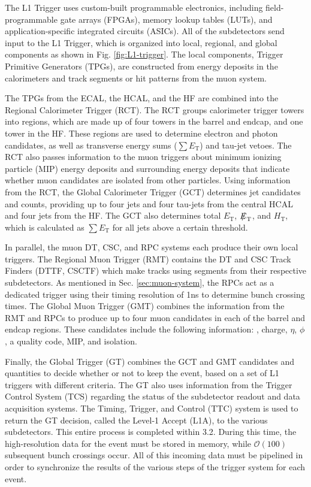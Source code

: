 \documentclass[12pt]{thesis}  %
\def\ET{\ensuremath{{E}_{\mathrm{T}}}}
\def\HT{\ensuremath{{H}_{\mathrm{T}}}}
\def\eslash{\ensuremath{{\hbox{$E$\kern-0.6em\lower-.05ex\hbox{/}\kern0.10em}}}}
\def\met{\mbox{$\eslash_\text{T}$}\xspace} %
\def\sumet{\mbox{$\sum E_\text{T}$}\xspace}
\begin{document}
The L1 Trigger uses custom-built programmable electronics, including field-programmable gate arrays (FPGAs), memory lookup tables (LUTs), and application-specific integrated circuits (ASICs). All of the subdetectors send input to the L1 Trigger, which is organized into local, regional, and global components as shown in Fig. \ref{fig:L1-trigger}. The local components, Trigger Primitive Generators (TPGs), are constructed from energy deposits in the calorimeters and track segments or hit patterns from the muon system.

The TPGs from the ECAL, the HCAL, and the HF are combined into the Regional Calorimeter Trigger (RCT). The RCT groups calorimeter trigger towers into regions, which are made up of four towers in the barrel and endcap, and one tower in the HF. These regions are used to determine electron and photon candidates, as well as transverse energy sums (\sumet) and tau-jet vetoes. The RCT also passes information to the muon triggers about minimum ionizing particle (MIP) energy deposits and surrounding energy deposits that indicate whether muon candidates are isolated from other particles. Using information from the RCT, the Global Calorimeter Trigger (GCT) determines jet candidates and counts, providing up to four jets and four tau-jets from the central HCAL and four jets from the HF. The GCT also determines total \ET, \met, and \HT, which is calculated as \sumet for all jets above a certain threshold.

In parallel, the muon DT, CSC, and RPC systems each produce their own local triggers. The Regional Muon Trigger (RMT) contains the DT and CSC Track Finders (DTTF, CSCTF) which make tracks using segments from their respective subdetectors. As mentioned in Sec. \ref{sec:muon-system}, the RPCs act as a dedicated trigger using their timing resolution of 1\unit{ns} to determine bunch crossing times. The Global Muon Trigger (GMT) combines the information from the RMT and RPCs to produce up to four muon candidates in each of the barrel and endcap regions. These candidates include the following information: \pt, charge, $\eta$, $\phi$, a quality code, MIP, and isolation.

Finally, the Global Trigger (GT) combines the GCT and GMT candidates and quantities to decide whether or not to keep the event, based on a set of L1 triggers with different criteria. The GT also uses information from the Trigger Control System (TCS) regarding the status of the subdetector readout and data acquisition systems. The Timing, Trigger, and Control (TTC) system is used to return the GT decision, called the Level-1 Accept (L1A), to the various subdetectors. This entire process is completed within 3.2\mus. During this time, the high-resolution data for the event must be stored in memory, while $\mathcal{O}(100)$ subsequent bunch crossings occur. All of this incoming data must be pipelined in order to synchronize the results of the various steps of the trigger system for each event.
\end{document}
